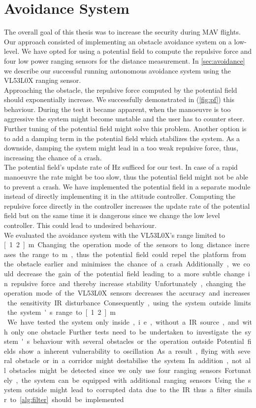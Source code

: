\section{Avoidance System}
The overall goal of this thesis was to increase the security during MAV flights. Our approach consisted of implementing an obstacle avoidance system on a low-level. We have opted for using a potential field to compute the repulsive force and four low power ranging sensors for the distance measurement. In \cref{sec:avoidance} we describe our successful running autonomous avoidance system using the VL53L0X ranging sensor. \\
Approaching the obstacle, the repulsive force computed by the potential field should exponentially increase. We successfully demonstrated in (\cref{fig:pf}) this behaviour. During the test it became apparent, when the manoeuvre is too aggressive the system might become unstable and the user has to counter steer. Further tuning of the potential field might solve this problem. Another option is to add a damping term in the potential field which stabilizes the system. As a downside, damping the system might lead in a too weak repulsive force, thus, increasing the chance of a crash.\\
The potential field's update rate of \unit[5]{Hz} sufficed for our test. In case of a rapid manoeuvre the rate might be too slow, thus the potential field might not be able to prevent a crash. We have implemented the potential field in a separate module instead of directly implementing it in the attitude controller. Computing the repulsive force directly in the controller increases the update rate of the potential field but on the same time it is dangerous since we change the low level controller. This could lead to undesired behaviour. \\
We evaluated the avoidance system with the VL53L0X's range limited to \unit[1.2]{m}. Changing the operation mode of the sensors to long distance increases the range to \unit[2]{m}, thus the potential field could repel the platform from the obstacle earlier and minimises the chance of a crash. Additionally, we could decrease the gain of the potential field leading to a more subtle change in repulsive force and thereby increase stability. Unfortunately, changing the operation mode of the VL53L0X sensors decreases the accuracy and increases the sensitivity IR disturbance. Consequently, using the system outside limits the system's range to \unit[1.2]{m}.\\
We have tested the system only inside, i.e., without a IR source, and with only one obstacle. Further tests need to be undertaken to investigate the system's behaviour with several obstacles or the operation outside. Potential fields show a inherent vulnerability to oscillation. As a result, flying with several obstacle or in a corridor might destabilise the system. In addition, not all obstacles might be detected since we only use four ranging sensors. Fortunately, the system can be equipped with additional ranging sensors. Using the system outside might lead to corrupted data due to the IR thus a filter similar to \cref{alg:filter} should be implemented.\\